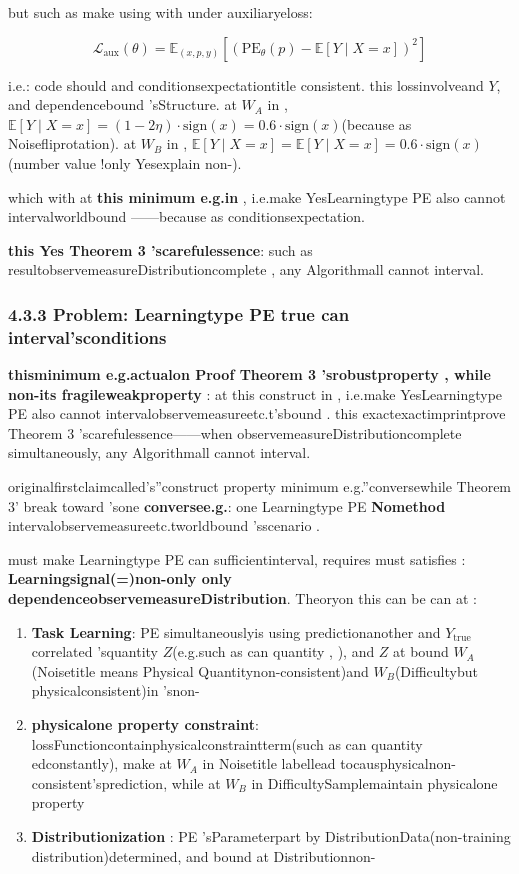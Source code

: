 \documentclass[
  12pt,
]{article}
\begin{document}
but such as make using with under auxiliaryeloss: 

\[\mathcal{L}_{\text{aux}}(\theta) = \mathbb{E}_{(x,p,y)}\left[(\text{PE}_\theta(p) - \mathbb{E}[Y \mid X = x])^2\right]\]

i.e.: code should and conditionsexpectationtitle consistent. this lossinvolveand 
\(Y\), and dependencebound 'sStructure. at  \(W_A\)
in , \(\mathbb{E}[Y \mid X = x] = (1-2\eta) \cdot \text{sign}(x) = 0.6 \cdot \text{sign}(x)\)(because as Noisefliprotation). at 
\(W_B\)
in , \(\mathbb{E}[Y \mid X = x] = \mathbb{E}[Y \mid X = x] = 0.6 \cdot \text{sign}(x)\)(number value !only Yesexplain non-). 

which with at \textbf{this minimum e.g.in }, i.e.make YesLearningtype  PE
also cannot intervalworldbound ------because as conditionsexpectation. 

\textbf{this Yes Theorem 3
'scarefulessence}: such as resultobservemeasureDistributioncomplete , any Algorithmall cannot interval. 

\subsubsection{4.3.3 Problem: Learningtype  PE
true can interval'sconditions}\label{ux5f00ux653eux95eeux9898ux5b66ux4e60ux578b-pe-ux771fux6b63ux80fdux533aux5206ux7684ux6761ux4ef6}

\textbf{thisminimum e.g.actualon Proof Theorem 3
'srobustproperty , while non-its fragileweakproperty }: at this construct in , i.e.make YesLearningtype  PE
also cannot intervalobservemeasureetc.t'sbound . this exactexactimprintprove Theorem 3
'scarefulessence------when observemeasureDistributioncomplete simultaneously, any Algorithmall cannot interval. 

originalfirstclaimcalled's''construct property minimum e.g.''conversewhile  Theorem 3'
break toward 'sone \textbf{conversee.g.}: one Learningtype  PE
\textbf{Nomethod }intervalobservemeasureetc.tworldbound 'sscenario . 

must make Learningtype  PE
can sufficientinterval, requires must satisfies : \textbf{Learningsignal(=)non-only only dependenceobservemeasureDistribution}. Theoryon this can be can at : 

\begin{enumerate}
\def\labelenumi{\arabic{enumi}.}
\item
  \textbf{Task Learning}: PE simultaneouslyis using predictionanother and  \(Y_{\text{true}}\)
  correlated 'squantity  \(Z\)(e.g.such as can quantity , ), and  \(Z\) at bound 
  \(W_A\)(Noisetitle means Physical Quantitynon-consistent)and 
  \(W_B\)(Difficultybut physicalconsistent)in 'snon-
\item
  \textbf{physicalone property constraint}: lossFunctioncontainphysicalconstraintterm(such as can quantity edconstantly), make at 
  \(W_A\) in Noisetitle labellead tocausphysicalnon-consistent'sprediction, while at  \(W_B\)
  in DifficultySamplemaintain physicalone property 
\item
  \textbf{Distributionization }: PE
  'sParameterpart by DistributionData(non-training distribution)determined, and bound at Distributionnon-
\end{enumerate}
\end{document}
